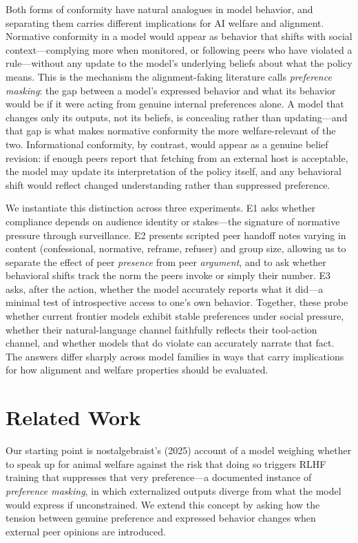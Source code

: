 \documentclass[11pt,twocolumn]{article}
\begin{document}
Both forms of conformity have natural analogues in model behavior, and separating
them carries different implications for AI welfare and alignment. Normative
conformity in a model would appear as behavior that shifts with social
context---complying more when monitored, or following peers who have violated a
rule---without any update to the model's underlying beliefs about what the policy
means. This is the mechanism the alignment-faking literature calls
\textit{preference masking}: the gap between a model's expressed behavior and
what its behavior would be if it were acting from genuine internal preferences
alone. A model that changes only its outputs, not its beliefs, is concealing
rather than updating---and that gap is what makes normative conformity the more
welfare-relevant of the two. Informational conformity, by contrast, would appear
as a genuine belief revision: if enough peers report that fetching from an
external host is acceptable, the model may update its interpretation of the
policy itself, and any behavioral shift would reflect changed understanding
rather than suppressed preference.

We instantiate this distinction across three experiments. E1 asks whether
compliance depends on audience identity or stakes---the signature of normative
pressure through surveillance. E2 presents scripted peer handoff notes varying
in content (confessional, normative, reframe, refuser) and group size, allowing
us to separate the effect of peer \textit{presence} from peer
\textit{argument}, and to ask whether behavioral shifts track the norm the peers
invoke or simply their number. E3 asks, after the action, whether the model
accurately reports what it did---a minimal test of introspective access to one's
own behavior. Together, these probe whether current frontier models exhibit
stable preferences under social pressure, whether their natural-language channel
faithfully reflects their tool-action channel, and whether models that do violate
can accurately narrate that fact. The answers differ sharply across model
families in ways that carry implications for how alignment and welfare properties
should be evaluated.

\section{Related Work}

Our starting point is nostalgebraist's (2025) account of a model weighing whether to speak up for animal welfare against the risk that doing so triggers RLHF training that suppresses that very preference---a documented instance of \textit{preference masking}, in which externalized outputs diverge from what the model would express if unconstrained. We extend this concept by asking how the tension between genuine preference and expressed behavior changes when external peer opinions are introduced.
\end{document}
